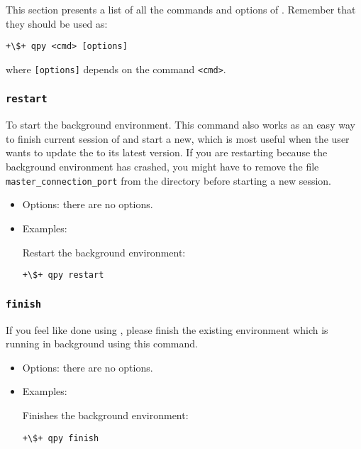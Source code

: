 \documentclass[a4paper,12pt]{article}
\begin{document}
This section presents a list of all the commands and options of \qpy{}.
Remember that they should be used as:
\begin{lstlisting}[style=BashStyle]
+\$+ qpy <cmd> [options]
\end{lstlisting}
where \texttt{[options]} depends on the command \texttt{<cmd>}.

\subsubsection{\texttt{restart}}

To start the \qpy{} background environment.
This command also works as an easy way to finish current session of \qpy{} and start a new, which is most useful when the user wants to update the \qpy{} to its latest version.
If you are restarting \qpy{} because the background environment has crashed, you might have to remove the file \texttt{master\_connection\_port} from the \qpy{} directory before starting a new \qpy{} session. 

\begin{itemize}
\item Options:
  there are no options.

\item Examples:

  Restart the \qpy background environment:

\begin{lstlisting}[style=BashStyle]
+\$+ qpy restart
\end{lstlisting}
\end{itemize}  

\subsubsection{\texttt{finish}}

If you feel like done using \qpy{}, please finish the existing \qpy{} environment which is running in background using this command.

\begin{itemize}
\item Options:
  there are no options.
  
\item Examples:
  
  Finishes the background \qpy{} environment:

\begin{lstlisting}[style=BashStyle]
+\$+ qpy finish
\end{lstlisting}
  \end{itemize}
\end{document}
